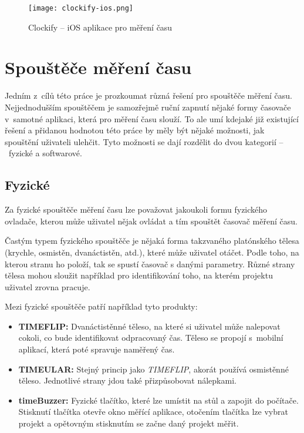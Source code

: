 \begin{figure}[h]
	\centering
	\texttt{[image: clockify-ios.png]}
	\caption{Clockify – iOS aplikace pro měření času \cite{clockify-ios}}
	\label{fig:clockify-ios}
\end{figure}

\section{Spouštěče měření času}\label{tracking-triggers}

Jedním z~cílů této práce je prozkoumat různá řešení pro spouštěče měření času. Nejjednodušším spouštěčem je samozřejmě ruční zapnutí nějaké formy časovače v~samotné aplikaci, která pro měření času slouží. To ale umí kdejaké již existující řešení a přidanou hodnotou této práce by měly být nějaké možnosti, jak spouštění uživateli ulehčit. Tyto možnosti se dají rozdělit do dvou kategorií – fyzické a softwarové.

\subsection{Fyzické}

Za fyzické spouštěče měření času lze považovat jakoukoli formu fyzického ovladače, kterou může uživatel nějak ovládat a tím spouštět časovač měření času.

Častým typem fyzického spouštěče je nějaká forma takzvaného platónského tělesa (krychle, osmistěn, dvanáctistěn, atd.), které může uživatel otáčet. Podle toho, na kterou stranu ho položí, tak se spustí časovač s danými parametry. Různé strany tělesa mohou sloužit například pro identifikování toho, na kterém projektu uživatel zrovna pracuje.

Mezi fyzické spouštěče patří například tyto produkty:
\begin{itemize}
\item\textbf{TIMEFLIP:} Dvanáctistěnné těleso, na které si uživatel může nalepovat cokoli, co bude identifikovat odpracovaný čas. Těleso se propojí s~mobilní aplikací, která poté spravuje naměřený čas. \cite{timeflip}
\item\textbf{TIMEULAR:} Stejný princip jako \emph{TIMEFLIP}, akorát používá osmistěnné těleso. Jednotlivé strany jdou také přizpůsobovat nálepkami. \cite{timeular}
\item\textbf{timeBuzzer:} Fyzické tlačítko, které lze umístit na stůl a zapojit do počítače. Stisknutí tlačítka otevře okno měřící aplikace, otočením tlačítka lze vybrat projekt a opětovným stisknutím se začne daný projekt měřit. \cite{timebuzzer}
\end{itemize}

